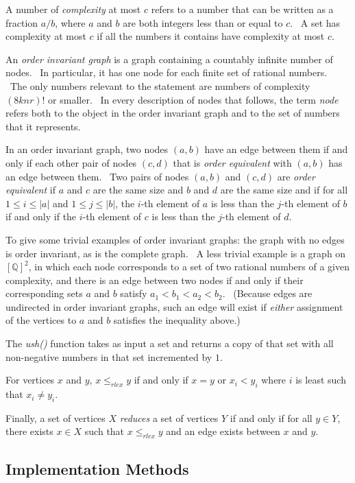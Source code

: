 \documentclass[11pt]{article}
\begin{document}
A number of \emph{complexity} at most $c$ refers to a number that can be written as a fraction $a/b$, where $a$ and $b$ are both integers less than or equal to $c$. \ A set has complexity at most $c$ if all the numbers it contains have complexity at most $c$.

An \emph{order invariant graph} is a graph containing a countably infinite number of nodes. \ In particular, it has one node for each finite set of rational numbers. \ The only numbers relevant to the statement are numbers of complexity $(8knr)!$ or smaller. \ In every description of nodes that follows, the term \emph{node} refers both to the object in the order invariant graph and to the set of numbers that it represents.

In an order invariant graph, two nodes $(a,b)$ have an edge between them if and only if each other pair of nodes $(c,d)$ that is \emph{order equivalent} with $(a,b)$ has an edge between them. \ Two pairs of nodes $(a, b)$ and $(c, d)$ are \emph{order equivalent} if $a$ and $c$ are the same size and $b$ and $d$ are the same size and if for all $1 \le i \le |a|$ and $1 \le j \le |b|$, the $i$-th element of $a$ is less than the $j$-th element of $b$ if and only if the $i$-th element of $c$ is less than the $j$-th element of $d$.

To give some trivial examples of order invariant graphs: the graph with no edges is order invariant, as is the complete graph. \ A less trivial example is a graph on $[\mathbb{Q}]^2$, in which each node corresponds to a set of two rational numbers of a given complexity, and there is an edge between two nodes if and only if their corresponding sets $a$ and $b$ satisfy $a_1 < b_1 < a_2 < b_2$. \ (Because edges are undirected in order invariant graphs, such an edge will exist if \emph{either} assignment of the vertices to $a$ and $b$ satisfies the inequality above.)

The \emph{ush()} function takes as input a set and returns a copy of that set with all non-negative numbers in that set incremented by $1$.

For vertices $x$ and $y$, $x \le_{rlex} y$ if and only if $x = y$ or $x_i < y_i$ where $i$ is least such that $x_i \not= y_i$.

Finally, a set of vertices $X$ \emph{reduces} a set of vertices $Y$ if and only if for all $y \in Y$, there exists $x \in X$ such that $x \le_{rlex} y$ and an edge exists between $x$ and $y$.

\subsection{Implementation Methods}
\end{document}
